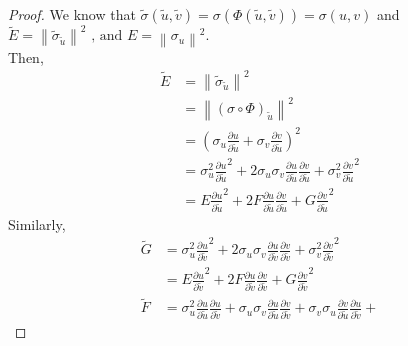 \documentclass{article}
\theoremstyle{plain}
\theoremstyle{definition}
\theoremstyle{remark}
\begin{document}
\begin{proof}[Proof]
    We know that
    \( \tilde{\sigma} (\tilde{u}, \tilde{v}) = \sigma(\Phi(\tilde{u}, \tilde{v})) = \sigma(u,v)\) and
    \( \tilde{E} = \left\lVert \tilde{\sigma}_{\tilde{u}}\right\rVert^2 \text{ , and } E = \left\lVert \sigma_u \right\rVert^2 \). \\
    Then,
    \begin{align*}
        \tilde{E} & = \left\lVert \tilde{\sigma}_{\tilde{u}}\right\rVert^2                                                                                                                                                         \\
                  & = \left\lVert (\sigma \circ \Phi)_{\tilde{u}}\right\rVert^2                                                                                                                                                    \\
                  & = \left( \sigma_u \frac{\partial u}{ \partial \tilde{u}} + \sigma_v \frac{\partial v}{ \partial \tilde{u}}\right) ^2                                                                                           \\
                  & = \sigma_u^2 \frac{\partial u}{ \partial \tilde{u}}^2 + 2\sigma_u \sigma_v \frac{\partial u}{ \partial \tilde{u}} \frac{\partial v}{ \partial \tilde{u}} + \sigma_v^2 \frac{\partial v}{ \partial \tilde{u}}^2 \\
                  & = E \frac{\partial u}{ \partial \tilde{u}}^2 + 2F \frac{\partial u}{ \partial \tilde{u}} \frac{\partial v}{ \partial \tilde{u}} + G \frac{\partial v}{ \partial \tilde{u}}^2
    \end{align*}
    Similarly,
    \begin{align*}
        \tilde{G} & = \sigma_u^2 \frac{\partial u}{ \partial \tilde{v}}^2 + 2\sigma_u \sigma_v \frac{\partial u}{ \partial \tilde{v}} \frac{\partial v}{ \partial \tilde{v}} + \sigma_v^2 \frac{\partial v}{ \partial \tilde{v}}^2 \\
                  & = E \frac{\partial u}{ \partial \tilde{v}}^2 + 2F \frac{\partial u}{ \partial \tilde{v}} \frac{\partial v}{ \partial \tilde{v}} + G \frac{\partial v}{ \partial \tilde{v}}^2                                   \\
        \tilde{F} & = \sigma_u^2 \frac{\partial u}{ \partial \tilde{u}} \frac{\partial u}{ \partial \tilde{v}} +
        \sigma_u \sigma_v \frac{\partial u}{ \partial \tilde{u}} \frac{\partial v}{ \partial \tilde{v}} +
        \sigma_v \sigma_u \frac{\partial v}{ \partial \tilde{u}} \frac{\partial u}{ \partial \tilde{v}} +

\end{align*}
\end{proof}
\end{document}
